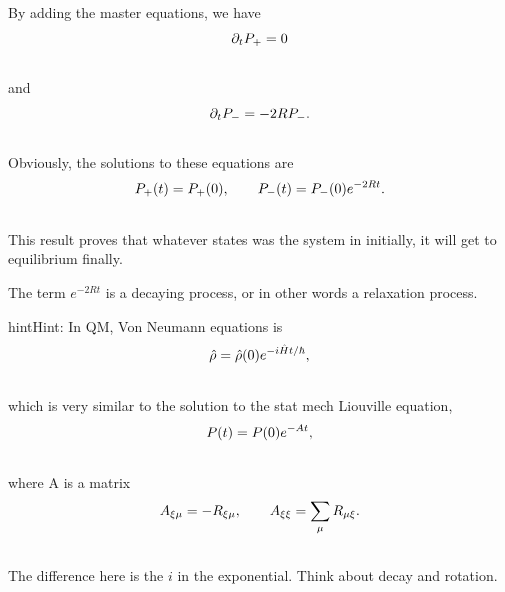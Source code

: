\documentclass[letterpaper,10pt,english]{sphinxmanual}
\begin{document}
By adding the master equations, we have
\begin{gather}
\begin{split}\partial_t P_+ = 0\end{split}\notag\\\begin{split}\end{split}\notag
\end{gather}
and
\begin{gather}
\begin{split}\partial_t P_- = -2R P_- .\end{split}\notag\\\begin{split}\end{split}\notag
\end{gather}
Obviously, the solutions to these equations are
\begin{gather}
\begin{split}P_+(t) = P_+(0), \qquad P_-(t) = P_-(0)e^{-2Rt} .\end{split}\notag\\\begin{split}\end{split}\notag
\end{gather}
This result proves that whatever states was the system in initially, it will get to equilibrium finally.

The term $e^{-2R t}$ is a decaying process, or in other words a relaxation process.

\begin{notice}{hint}{Hint:}
In QM, Von Neumann equations is
\begin{gather}
\begin{split}\hat \rho = \hat\rho(0) e^{-i \hat H t/\hbar},\end{split}\notag\\\begin{split}\end{split}\notag
\end{gather}
which is very similar to the solution to the stat mech Liouville equation,
\begin{gather}
\begin{split}P(t) = P(0) e^{-A t},\end{split}\notag\\\begin{split}\end{split}\notag
\end{gather}
where A is a matrix
\begin{gather}
\begin{split}A_{\xi\mu} = -R_{\xi\mu}, \qquad A_{\xi\xi} = \sum_\mu R_{\mu\xi} .\end{split}\notag\\\begin{split}\end{split}\notag
\end{gather}
The difference here is the $i$ in the exponential. Think about decay and rotation.
\end{notice}
\end{document}
